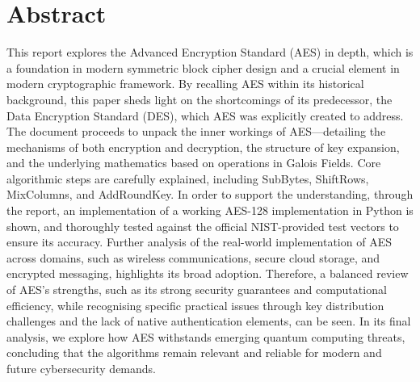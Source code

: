 \section*{Abstract} %

This report explores the Advanced Encryption Standard (AES) in depth, 
which is a foundation in modern symmetric block cipher design and a crucial element in modern cryptographic framework. By recalling AES within its historical background, this paper sheds light on the shortcomings of its predecessor, the Data Encryption Standard (DES), which AES was explicitly created to address. 
The document proceeds to unpack the inner workings of AES—detailing the mechanisms of both encryption and decryption, 
the structure of key expansion, 
and the underlying mathematics based on operations in Galois Fields. 
Core algorithmic steps are carefully explained, 
including SubBytes, ShiftRows, MixColumns, and AddRoundKey. 
In order to support the understanding, through the report, an implementation of a working AES-128 implementation in Python is shown, 
and thoroughly tested against the official NIST-provided test vectors to ensure its accuracy.
Further analysis of the real-world implementation of AES across domains, such as wireless communications, secure cloud storage, and encrypted messaging, highlights its broad adoption. 
Therefore, a balanced review of AES's strengths, 
such as its strong security guarantees and computational efficiency, 
while recognising specific practical issues through key distribution challenges and the lack of native authentication elements, can be seen. 
In its final analysis, we explore how AES withstands emerging quantum computing threats, 
concluding that the algorithms remain relevant and reliable for modern and future cybersecurity demands.